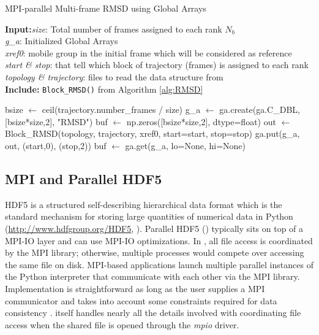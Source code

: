 \begin{algorithm}[ht!]
	\scriptsize
	\caption{MPI-parallel Multi-frame RMSD using Global Arrays}
	\label{alg:GA}
	\hspace*{\algorithmicindent} \textbf{Input:}\emph{size}: Total number of frames assigned to each rank $N_{b}$\\
	\hspace*{\algorithmicindent} \emph{g\_a}: Initialized Global Arrays \\
	\hspace*{\algorithmicindent} \emph{xref0}: mobile group in the initial frame which will be considered as reference \\
	\hspace*{\algorithmicindent} \emph{start \& stop}: that tell which block of trajectory (frames) is assigned to each rank \\
	\hspace*{\algorithmicindent} \emph{topology \& trajectory}: files to read the data structure from \\
	\hspace*{\algorithmicindent}\textbf{Include:} \texttt{Block\_RMSD()} from Algorithm \ref{alg:RMSD}
	\begin{algorithmic}[1]
		
		\State bsize $\leftarrow$ ceil(trajectory.number\_frames / size)
		\State g\_a $\leftarrow$ ga.create(ga.C\_DBL, [bsize*size,2], "RMSD")
		\State buf $\leftarrow$ np.zeros([bsize*size,2], dtype=float)
		\State out $\leftarrow$ Block\_RMSD(topology, trajectory, xref0, start=start, stop=stop)
		\State ga.put(g\_a, out, (start,0), (stop,2))
		\State buf $\leftarrow$ ga.get(g\_a, lo=None, hi=None)
		\EndIf
	\end{algorithmic}
\end{algorithm}

\subsection{MPI and Parallel HDF5}
\label{sec:methods-hdf5}

HDF5 is a structured self-describing hierarchical data format which is the standard mechanism for storing large quantities of numerical data in Python (\url{http://www.hdfgroup.org/HDF5}, \cite{pythonhdf5}).
Parallel HDF5 () typically sits on top of a MPI-IO layer and can use MPI-IO optimizations. 
In , all file access is coordinated by the MPI library; otherwise, multiple processes would compete over accessing the same file on disk. 
MPI-based applications launch multiple parallel instances of the Python interpreter that communicate with each other via the MPI library. 
Implementation is straightforward as long as the user supplies a MPI communicator and takes into account some constraints required for data consistency \cite{pythonhdf5}.
 itself handles nearly all the details involved with coordinating file access when the shared file is opened through the \emph{mpio} driver.

